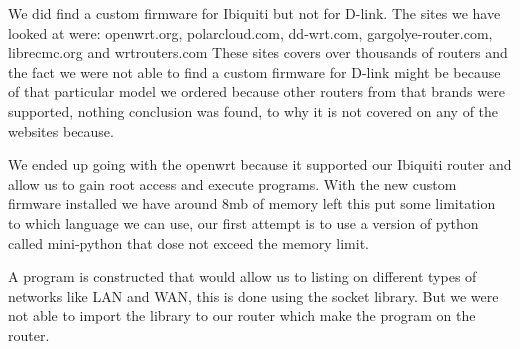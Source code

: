 We did find a custom firmware for Ibiquiti but not for D-link. The sites we have looked at were: openwrt.org, polarcloud.com, dd-wrt.com, gargolye-router.com, librecmc.org and wrtrouters.com These sites covers over thousands of routers and the fact we were not able to find a custom firmware for D-link might be because of that particular model we ordered because other routers from that brands were supported, nothing conclusion was found, to why it is not covered on any of the websites because.

We ended up going with the openwrt because it supported our Ibiquiti router and allow us to gain root access and execute programs. With the new custom firmware installed we have around 8mb of memory left this put some limitation to which language we can use, our first attempt is to use a version of python called mini-python that dose not exceed the memory limit.

A program is constructed that would allow us to listing on different types of networks like LAN and WAN, this is done using the socket library. But we were not able to import the library to our router which make the program on the router.